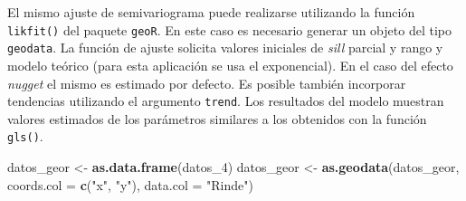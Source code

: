 \documentclass[11pt,b5paper,]{krantz}
\newenvironment{Shaded}{}{}
\newcommand{\DataTypeTok}[1]{\textcolor[rgb]{0.56,0.13,0.00}{#1}}
\newcommand{\DecValTok}[1]{\textcolor[rgb]{0.25,0.63,0.44}{#1}}
\newcommand{\KeywordTok}[1]{\textcolor[rgb]{0.00,0.44,0.13}{\textbf{#1}}}
\newcommand{\NormalTok}[1]{#1}
\newcommand{\StringTok}[1]{\textcolor[rgb]{0.25,0.44,0.63}{#1}}
\begin{document}
El mismo ajuste de semivariograma puede realizarse utilizando la función \texttt{likfit()} del paquete \texttt{geoR}. En este caso es necesario generar un objeto del tipo \texttt{geodata}. La función de ajuste solicita valores iniciales de \emph{sill} parcial y rango y modelo teórico (para esta aplicación se usa el exponencial). En el caso del efecto \emph{nugget} el mismo es estimado por defecto. Es posible también incorporar tendencias utilizando el argumento \texttt{trend}. Los resultados del modelo muestran valores estimados de los parámetros similares a los obtenidos con la función \texttt{gls()}.

\begin{Shaded}
\begin{Highlighting}[]
\NormalTok{datos_geor <-}\StringTok{ }\KeywordTok{as.data.frame}\NormalTok{(datos_}\DecValTok{4}\NormalTok{)}
\NormalTok{datos_geor <-}
\StringTok{  }\KeywordTok{as.geodata}\NormalTok{(datos_geor,}
             \DataTypeTok{coords.col =} \KeywordTok{c}\NormalTok{(}\StringTok{"x"}\NormalTok{, }\StringTok{"y"}\NormalTok{),}
             \DataTypeTok{data.col =} \StringTok{"Rinde"}\NormalTok{)}


\end{Highlighting}
\end{Shaded}
\end{document}

